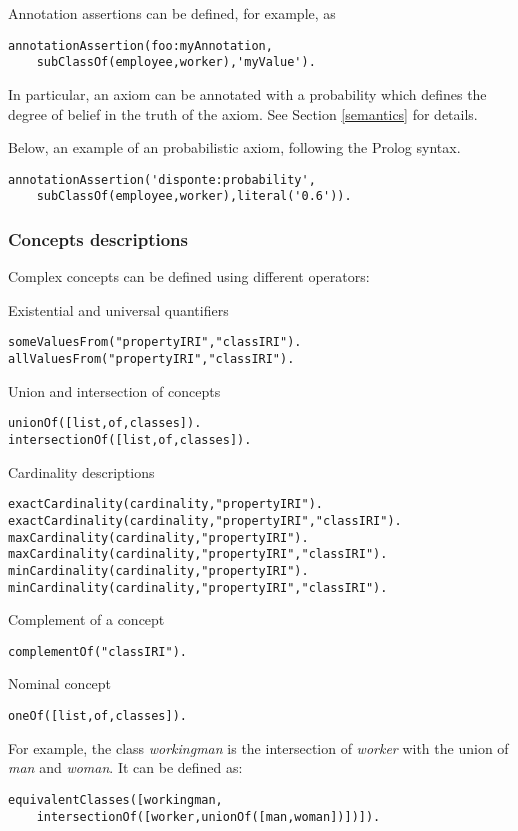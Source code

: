 Annotation assertions can be defined, for example, as
\begin{verbatim}
annotationAssertion(foo:myAnnotation,
    subClassOf(employee,worker),'myValue').
\end{verbatim}


In particular, an axiom can be annotated with a probability which defines the degree of belief in the truth of the axiom. See Section \ref{semantics} for details.


Below, an example of an probabilistic axiom, following the Prolog syntax.
\begin{verbatim}
annotationAssertion('disponte:probability',
    subClassOf(employee,worker),literal('0.6')).
\end{verbatim}

\subsubsection{Concepts descriptions}
Complex concepts can be defined using different operators:

\noindent
Existential and universal quantifiers
\begin{verbatim}
someValuesFrom("propertyIRI","classIRI").
allValuesFrom("propertyIRI","classIRI").
\end{verbatim}
Union and intersection of concepts
\begin{verbatim}
unionOf([list,of,classes]).
intersectionOf([list,of,classes]).
\end{verbatim}
Cardinality descriptions
\begin{verbatim}
exactCardinality(cardinality,"propertyIRI").
exactCardinality(cardinality,"propertyIRI","classIRI").
maxCardinality(cardinality,"propertyIRI").
maxCardinality(cardinality,"propertyIRI","classIRI").
minCardinality(cardinality,"propertyIRI").
minCardinality(cardinality,"propertyIRI","classIRI").
\end{verbatim}
Complement of a concept
\begin{verbatim}
complementOf("classIRI").
\end{verbatim}
Nominal concept
\begin{verbatim}
oneOf([list,of,classes]).
\end{verbatim}

For example, the class \textit{workingman} is the intersection of \textit{worker} with the union of \textit{man} and \textit{woman}. It can be defined as:
\begin{verbatim}
equivalentClasses([workingman,
    intersectionOf([worker,unionOf([man,woman])])]).
\end{verbatim}

